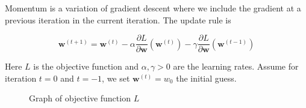 \documentclass[addpoints,12pt,answers]{exam}
\begin{document}
\begin{questions}


Momentum is a variation of gradient descent where we include the gradient at a previous iteration in the current iteration. The update rule is 

$$\mathbf{w}^{(t+1)} = \mathbf{w}^{(t)} - \alpha \frac{\partial L}{\partial \mathbf{w}} \left(\mathbf{w}^{(t)}\right) - \gamma \frac{\partial L}{\partial \mathbf{w}}\left(\mathbf{w}^{(t-1)}\right)$$

Here $L$ is the objective function and $\alpha, \gamma > 0$ are the learning rates. Assume for iteration $t=0$ and $t=-1$, we set $\mathbf{w}^{(t)} = w_0 $  the initial guess.
\begin{figure}[h]
  \begin{minipage}[c]{0.8\textwidth}
  \end{minipage}\hfill
  \begin{minipage}[c]{0.2\textwidth}
\caption{Graph of objective function $L$}
  \label{fig:gd}
  \end{minipage}
\end{figure}


\end{questions}
\end{document}
